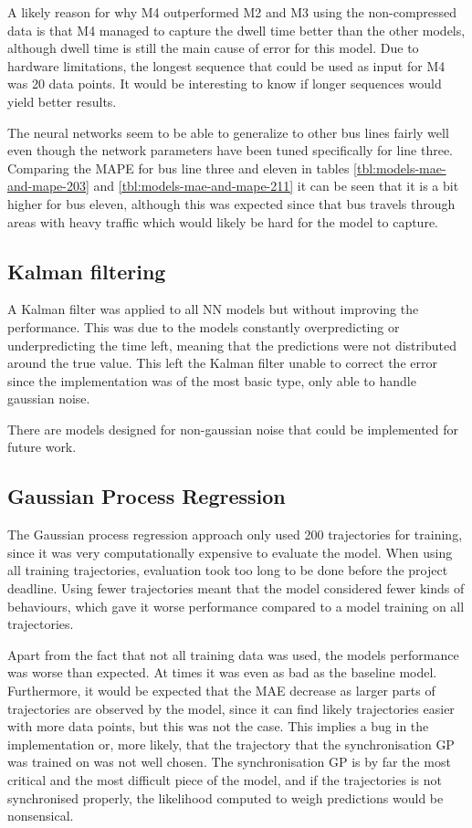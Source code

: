 A likely reason for why M4 outperformed M2 and M3 using the non-compressed data is that M4 managed to capture the dwell time better than the other models, although dwell time is still the main cause of error for this model. Due to hardware limitations, the longest sequence that could be used as input for M4 was 20 data points. It would be interesting to know if longer sequences would yield better results.

The neural networks seem to be able to generalize to other bus lines fairly well even though the network parameters have been tuned specifically for line three. Comparing the MAPE for bus line three and eleven in tables \ref{tbl:models-mae-and-mape-203} and \ref{tbl:models-mae-and-mape-211} it can be seen that it is a bit higher for bus eleven, although this was expected since that bus travels through areas with heavy traffic which would likely be hard for the model to capture.

\subsection{Kalman filtering}
A Kalman filter was applied to all NN models but without improving the performance. This was due to the models constantly overpredicting or underpredicting the time left, meaning that the predictions were not distributed around the true value. This left the Kalman filter unable to correct the error since the implementation was of the most basic type, only able to handle gaussian noise. 

There are models designed for non-gaussian noise that could be implemented for future work.

\subsection{Gaussian Process Regression}
The Gaussian process regression approach only used 200 trajectories
for training, since it was very computationally expensive to evaluate
the model. When using all training trajectories, evaluation took too
long to be done before the project deadline. Using fewer trajectories
meant that the model considered fewer kinds of behaviours, which gave
it worse performance compared to a model training on all trajectories.

Apart from the fact that not all training data was used, the models performance was worse than expected. At times it was even as bad as the baseline model. Furthermore, it would be expected that the MAE decrease as larger parts of trajectories are observed by the model, since it can find likely trajectories easier with more data points, but this was not the case. This implies a bug in the implementation or, more likely, that the trajectory that the synchronisation GP was trained on was not well chosen. The synchronisation GP is by far the most critical and the most difficult piece of the model, and if the trajectories is not synchronised properly, the likelihood computed to weigh predictions would be nonsensical. 

